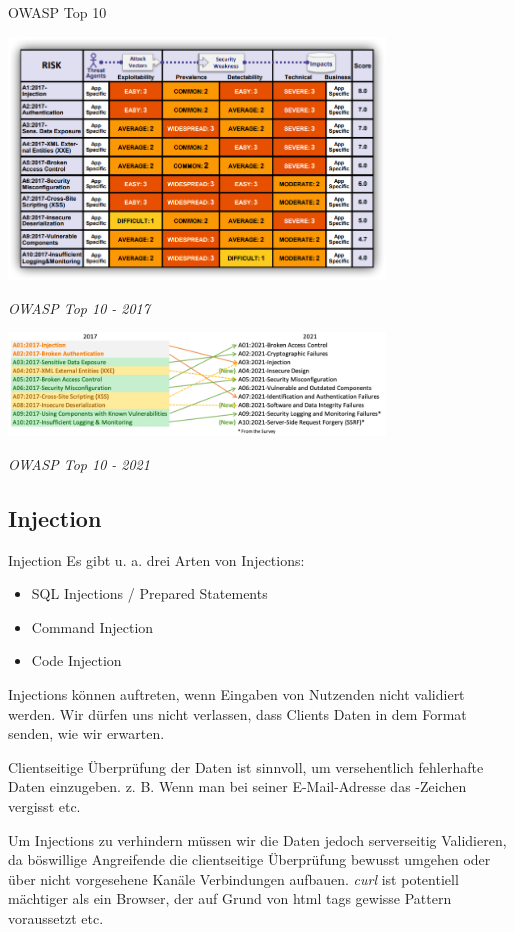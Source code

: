 \begin{bonus}{OWASP Top 10}
    \begin{center}
        \includegraphics[width=0.75\textwidth]{includes/figures/bonus_owasp_top10_2017.png}

        \emph{OWASP Top 10 - 2017}

        \vspace{2.5em}

        \includegraphics[width=0.75\textwidth]{includes/figures/bonus_owasp_top10_2021.png}

        \emph{OWASP Top 10 - 2021}
    \end{center}
\end{bonus}

\subsection{Injection}

\begin{defi}{Injection}
    Es gibt u. a. drei Arten von Injections:
    \begin{itemize}
        \item SQL Injections / Prepared Statements
        \item Command Injection
        \item Code Injection
    \end{itemize}

    Injections können auftreten, wenn Eingaben von Nutzenden nicht validiert werden.
    Wir dürfen uns nicht verlassen, dass Clients Daten in dem Format senden, wie wir erwarten.

    Clientseitige Überprüfung der Daten ist sinnvoll, um versehentlich fehlerhafte Daten einzugeben.
    z. B. Wenn man bei seiner E-Mail-Adresse das \texttt{\@}-Zeichen vergisst etc.

    Um Injections zu verhindern müssen wir die Daten jedoch serverseitig Validieren, da böswillige Angreifende die clientseitige Überprüfung bewusst umgehen oder über nicht vorgesehene Kanäle Verbindungen aufbauen.
    \emph{curl} ist potentiell mächtiger als ein Browser, der auf Grund von html tags gewisse Pattern voraussetzt etc.
\end{defi}

